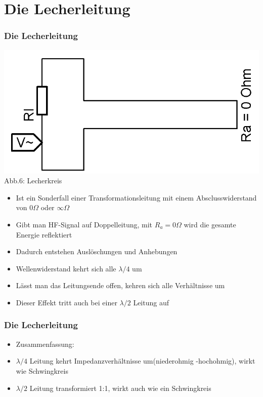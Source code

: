 \section*{Die Lecherleitung}
\begin{frame}
\frametitle{Die Lecherleitung}
\begin{center}
\includegraphics[scale=0.25]{a10/Lecherkreis.png}\\
Abb.6: Lecherkreis
\end{center}
\begin{itemize}
	\item	Ist ein Sonderfall einer Transformationsleitung mit einem Absclusswiderstand von $0 \Omega$ oder $\infty \Omega$
	\item	 Gibt man HF-Signal auf Doppelleitung, mit $R_a = 0 \Omega$ wird die gesamte Energie reflektiert
	\item	Dadurch entstehen Auslöschungen und Anhebungen
	\item	Wellenwiderstand kehrt sich alle $\lambda /4$ um
	\item	Lässt man das Leitungsende offen, kehren sich alle Verhältnisse um
	\item	Dieser Effekt tritt auch bei einer $\lambda /2$ Leitung auf
\end{itemize} 
\end{frame}

\begin{frame}
\frametitle{Die Lecherleitung}
\begin{Large}
\begin{itemize}
	\item	Zusammenfassung:
	\vspace{1cm}
	\item	$\lambda /4$ Leitung kehrt Impedanzverhältnisse um(niederohmig -hochohmig), wirkt wie Schwingkreis
	\vspace{1cm}
	\item	$\lambda /2$ Leitung transformiert 1:1, wirkt auch wie ein Schwingkreis
\end{itemize}
\end{Large}
\end{frame}

